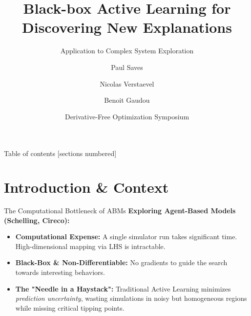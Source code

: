 \documentclass[10pt, aspectratio=169]{beamer}
\title{Black-box Active Learning for Discovering New Explanations}
\subtitle{Application to Complex System Exploration}
\date{Derivative-Free Optimization Symposium}
\author{Paul Saves \inst{1} \and Nicolas Verstaevel \inst{1} \and Benoit Gaudou \inst{1}}
\institute{\inst{1} Université Toulouse Capitole, IRIT, France}
\begin{document}
\maketitle

\begin{frame}{Table of contents}
  [sections numbered]
  \tableofcontents[hideallsubsections]
\end{frame}

\section{Introduction \& Context}

\begin{frame}[fragile]{The Computational Bottleneck of ABMs}
  \textbf{Exploring Agent-Based Models (Schelling, Cireco):}
  \begin{itemize}
    \item \textbf{Computational Expense:} A single simulator run takes significant time. High-dimensional mapping via LHS is intractable.
    \item \textbf{Black-Box \& Non-Differentiable:} No gradients to guide the search towards interesting behaviors.
    \item \textbf{The "Needle in a Haystack":} Traditional Active Learning minimizes \textit{prediction uncertainty}, wasting simulations in noisy but homogeneous regions while missing critical tipping points.
  \end{itemize}
\end{frame}
\end{document}
